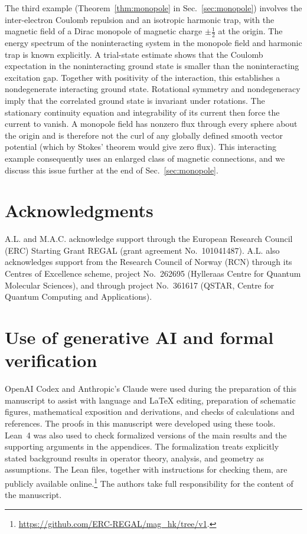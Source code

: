 \documentclass[11pt,a4paper]{article}
\theoremstyle{remark}
\theoremstyle{plain}
\begin{document}
The third example (Theorem~\ref{thm:monopole} in
Sec.~\ref{sec:monopole}) involves the inter-electron Coulomb
repulsion and an isotropic harmonic trap, with the magnetic field of a
Dirac monopole \cite{Dirac1931} of magnetic charge $\pm\tfrac12$ at the origin.
The energy spectrum of the noninteracting system in the
monopole field and harmonic trap is known explicitly.
A trial-state estimate shows that the Coulomb expectation
in the noninteracting ground state is smaller than the
noninteracting excitation gap. Together with positivity
of the interaction, this establishes a nondegenerate
interacting ground state. 
Rotational symmetry and nondegeneracy imply that the
correlated ground state is invariant under rotations.
The stationary continuity equation and integrability of
its current then force the current to vanish. 
A monopole field has nonzero flux
through every sphere about the origin and is therefore not the curl of
any globally defined smooth vector potential 
(which by Stokes' theorem would give zero flux). 
This interacting example consequently 
uses an enlarged class of magnetic connections, and we 
discuss this issue further at the end of Sec.~\ref{sec:monopole}.

\section*{Acknowledgments}
A.L. and M.A.C. acknowledge support through the European Research Council
(ERC) Starting Grant REGAL (grant agreement No.~101041487).
A.L. also acknowledges support from the Research Council of Norway (RCN)
through its Centres of Excellence scheme, project No.~262695
(Hylleraas Centre for Quantum Molecular Sciences), and through
project No.~361617 (QSTAR, Centre for Quantum Computing and Applications).

\section*{Use of generative AI and formal verification}
OpenAI Codex and Anthropic's Claude were used during the
preparation of this manuscript to assist with language and \LaTeX{}
editing, preparation of schematic figures, mathematical exposition and
derivations, and checks of calculations and references. The proofs in
this manuscript were developed using these tools. 
Lean~4 was also used to check formalized versions of the main results
and the supporting arguments in the appendices. The formalization treats
explicitly stated background results in operator theory, analysis, and
geometry as assumptions. The Lean files, together with instructions for
checking them, are publicly available online.\footnote{\label{fn:lean-repository}%
\url{https://github.com/ERC-REGAL/mag_hk/tree/v1}.}
The authors take full responsibility for the
content of the manuscript.
\end{document}
